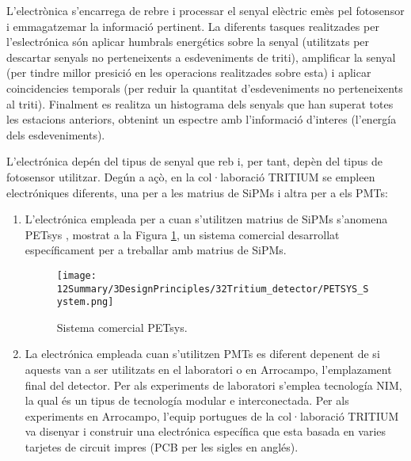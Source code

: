 L'electrònica s'encarrega de rebre i processar el senyal elèctric emès pel fotosensor i emmagatzemar la informació pertinent. La diferents tasques realitzades per l'eslectrónica són aplicar humbrals energétics sobre la senyal (utilitzats per descartar senyals no perteneixents a esdeveniments de triti), amplificar la senyal (per tindre millor presició en les operacions realitzades sobre esta) i aplicar coincidencies temporals (per reduir la quantitat d'esdeveniments no perteneixents al triti). Finalment es realitza un histograma dels senyals que han superat totes les estacions anteriors, obtenint un espectre amb l'informació d'interes (l'energía dels esdeveniments). 

L'electrónica depén del tipus de senyal que reb i, per tant, depèn del tipus de fotosensor utilitzar. Degún a açò, en la col·laboració TRITIUM se empleen electróniques diferents, una per a les matrius de SiPMs i altra per a els PMTs:

\begin{enumerate}

\item{} L'electrónica empleada per a cuan s'utilitzen matrius de SiPMs s'anomena PETsys \cite{PETSYS}, mostrat a la Figura \ref{fig:PETSYSs}, un sistema comercial desarrollat específicament per a treballar amb matrius de SiPMs. 

\begin{figure}[h]
\texttt{[image: 12Summary/3DesignPrinciples/32Tritium\_detector/PETSYS\_System.png]}
\centering
\caption{Sistema comercial PETsys\label{fig:PETSYSs}.}
\end{figure}

\item{} La electrónica empleada cuan s'utilitzen PMTs es diferent depenent de si aquests van a ser utilitzats en el laboratori o en Arrocampo, l'emplazament final del detector. Per als experiments de laboratori s'emplea tecnología NIM, la qual és un tipus de tecnología modular e interconectada. Per als experiments en Arrocampo, l'equip portugues de la col·laboració TRITIUM va disenyar i construir una electrónica específica que esta basada en varies tarjetes de circuit impres (PCB per les sigles en anglés).

\end{enumerate}